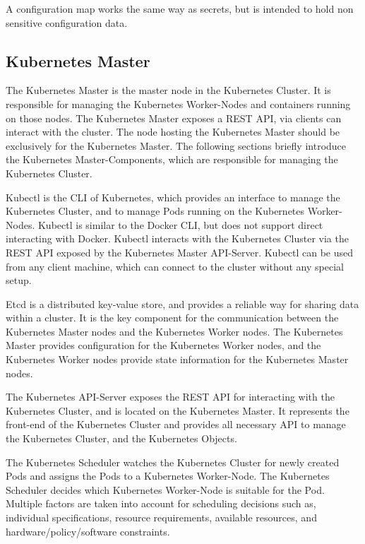 A configuration map works the same way as secrets, but is intended to hold non sensitive configuration data\cite{CNCFKubernetesConfigMap2018}.

\subsection{Kubernetes Master}
\label{sec:caas-kubernetes-master}
The Kubernetes Master is the master node in the Kubernetes Cluster. It is responsible for managing the Kubernetes Worker-Nodes and containers running on those nodes. The Kubernetes Master exposes a REST API, via clients can interact with the cluster. The node hosting the Kubernetes Master should be exclusively for the Kubernetes Master. The following sections briefly introduce the Kubernetes Master-Components, which are responsible for managing the Kubernetes Cluster\cite{CNCFKubernetesComponents2018}.

Kubectl is the CLI of Kubernetes, which provides an interface to manage the Kubernetes Cluster, and to manage Pods running on the Kubernetes Worker-Nodes. Kubectl is similar to the Docker CLI, but does not support direct interacting with Docker. Kubectl interacts with the Kubernetes Cluster via the REST API exposed by the Kubernetes Master API-Server. Kubectl can be used from any client machine, which can connect to the cluster without any special setup.

Etcd is a distributed key-value store, and provides a reliable way for sharing data within a cluster. It is the key component for the communication between the Kubernetes Master nodes and the Kubernetes Worker nodes. The Kubernetes Master provides configuration for the Kubernetes Worker nodes, and the Kubernetes Worker nodes provide state information for the Kubernetes Master nodes\cite{CoreOSETCD2018}.

The Kubernetes API-Server exposes the REST API for interacting with the Kubernetes Cluster, and is located on the Kubernetes Master. It represents the front-end of the Kubernetes Cluster and provides all necessary API to manage the Kubernetes Cluster, and the Kubernetes Objects.

The Kubernetes Scheduler watches the Kubernetes Cluster for newly created Pods and assigns the Pods to a Kubernetes Worker-Node. The Kubernetes Scheduler decides which Kubernetes Worker-Node is suitable for the Pod. Multiple factors are taken into account for scheduling decisions such as, individual specifications, resource requirements, available resources, and hardware/policy/software constraints.

